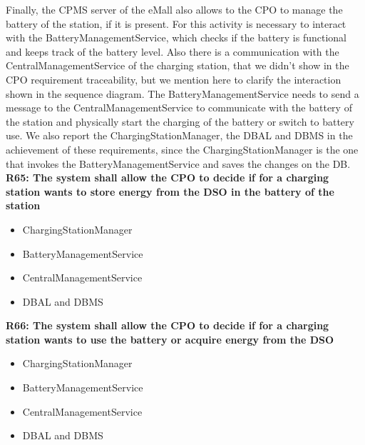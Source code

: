 Finally, the CPMS server of the eMall also allows to the CPO to manage the battery of the station, if it is present. For this activity is necessary to interact with the BatteryManagementService, which checks if the battery is functional and keeps track of the battery level. Also there is a communication with the CentralManagementService of the charging station, that we didn't show in the CPO requirement traceability, but we mention here to clarify the interaction shown in the sequence diagram. The BatteryManagementService needs to send a message to the CentralManagementService to communicate with the battery of the station and physically start the charging of the battery or switch to battery use. We also report the ChargingStationManager, the DBAL and DBMS in the achievement of these requirements, since the ChargingStationManager is the one that invokes the BatteryManagementService and saves the changes on the DB.\\
\textbf{R65: The system shall allow the CPO to decide if for a charging station wants to store energy from the DSO in the battery of the station}
\begin{itemize}
    \item ChargingStationManager
    \item BatteryManagementService
    \item CentralManagementService
    \item DBAL and DBMS
\end{itemize}

\textbf{R66: The system shall allow the CPO to decide if for a charging station wants to use the battery or acquire energy from the DSO}
\begin{itemize}
    \item ChargingStationManager
    \item BatteryManagementService
    \item CentralManagementService
    \item DBAL and DBMS
\end{itemize}

